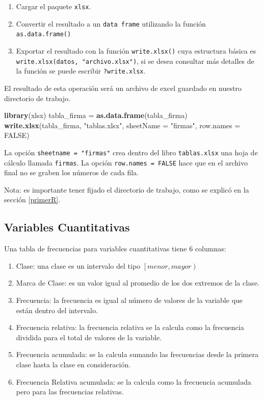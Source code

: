 \documentclass[letterpaper,]{book}
\newenvironment{Shaded}{\begin{snugshade}}{\end{snugshade}}
\newcommand{\DataTypeTok}[1]{\textcolor[rgb]{0.13,0.29,0.53}{#1}}
\newcommand{\KeywordTok}[1]{\textcolor[rgb]{0.13,0.29,0.53}{\textbf{#1}}}
\newcommand{\NormalTok}[1]{#1}
\newcommand{\OtherTok}[1]{\textcolor[rgb]{0.56,0.35,0.01}{#1}}
\newcommand{\StringTok}[1]{\textcolor[rgb]{0.31,0.60,0.02}{#1}}
\providecommand{\tightlist}{%
  \setlength{\itemsep}{0pt}\setlength{\parskip}{0pt}}
\begin{document}
\begin{enumerate}
\def\labelenumi{\arabic{enumi}.}
\tightlist
\item
  Cargar el paquete \texttt{xlsx}.
\item
  Convertir el resultado a un \texttt{data\ frame} utilizando la función \texttt{as.data.frame()}
\item
  Exportar el resultado con la función \texttt{write.xlsx()} cuya estructura básica es \texttt{write.xlsx(datos,\ "archivo.xlsx")}, si se desea consultar más detalles de la función se puede escribir \texttt{?write.xlsx}.
\end{enumerate}

El resultado de esta operación será un archivo de excel guardado en nuestro directorio de trabajo.

\begin{Shaded}
\begin{Highlighting}[]
\KeywordTok{library}\NormalTok{(xlsx)}
\NormalTok{tabla_firma =}\StringTok{ }\KeywordTok{as.data.frame}\NormalTok{(tabla_firma)}
\KeywordTok{write.xlsx}\NormalTok{(tabla_firma, }\StringTok{"tablas.xlsx"}\NormalTok{, }\DataTypeTok{sheetName =} \StringTok{"firmas"}\NormalTok{, }\DataTypeTok{row.names =} \OtherTok{FALSE}\NormalTok{)}
\end{Highlighting}
\end{Shaded}

La opción \texttt{sheetname\ =\ "firmas"} crea dentro del libro \texttt{tablas.xlsx} una hoja de cálculo llamada \texttt{firmas}. La opción \texttt{row.names\ =\ FALSE} hace que en el archivo final no se graben los números de cada fila.

Nota: es importante tener fijado el directorio de trabajo, como se explicó en la sección \ref{primerR}.

\hypertarget{variables-cuantitativas}{%
\subsection{Variables Cuantitativas}\label{variables-cuantitativas}}

Una tabla de frecuencias para variables cuantitativas tiene 6 columnas:

\begin{enumerate}
\def\labelenumi{\arabic{enumi}.}
\tightlist
\item
  Clase: una clase es un intervalo del tipo \(\left[ menor, mayor \right)\)
\item
  Marca de Clase: es un valor igual al promedio de los dos extremos de la clase.
\item
  Frecuencia: la frecuencia es igual al número de valores de la variable que están dentro del intervalo.
\item
  Frecuencia relativa: la frecuencia relativa se la calcula como la frecuencia dividida para el total de valores de la variable.
\item
  Frecuencia acumulada: se la calcula sumando las frecuencias desde la primera clase hasta la clase en consideración.
\item
  Frecuencia Relativa acumulada: se la calcula como la frecuencia acumulada pero para las frecuencias relativas.
\end{enumerate}
\end{document}
